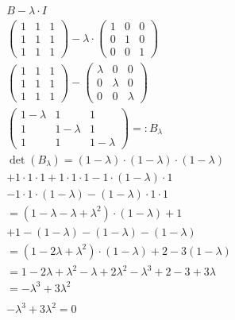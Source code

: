 \begin{align*}
    B - \lambda \cdot I \\
    \begin{pmatrix}
        1 & 1 & 1 \\
        1 & 1 & 1 \\
        1 & 1 & 1
    \end{pmatrix} - \lambda \cdot \begin{pmatrix}
        1 & 0 & 0 \\
        0 & 1 & 0 \\
        0 & 0 & 1
    \end{pmatrix} \\
        \begin{pmatrix}
        1 & 1 & 1 \\
        1 & 1 & 1 \\
        1 & 1 & 1
    \end{pmatrix} - \begin{pmatrix}
        \lambda & 0 & 0 \\
        0 & \lambda & 0 \\
        0 & 0 & \lambda
    \end{pmatrix} \\
    \begin{pmatrix}
        1 - \lambda & 1 & 1 \\
        1 & 1 - \lambda & 1 \\
        1 & 1 & 1 - \lambda
    \end{pmatrix} =: B_\lambda \\
    \det(B_\lambda) = (1 - \lambda) \cdot (1 - \lambda) \cdot (1 - \lambda) \\
                    + 1 \cdot 1 \cdot 1 + 1 \cdot 1 \cdot 1 - 1 \cdot (1 - \lambda) \cdot 1 \\
                    - 1 \cdot 1 \cdot (1 - \lambda) - (1 - \lambda) \cdot 1 \cdot 1 \\
    = (1 -\lambda - \lambda + \lambda^2) \cdot (1 - \lambda) + 1 \\
        + 1 - (1 - \lambda) - (1 - \lambda) - (1 - \lambda) \\
    = (1 - 2\lambda + \lambda^2) \cdot (1 - \lambda) + 2 - 3(1 - \lambda) \\
    = 1 - 2\lambda + \lambda^2 - \lambda + 2\lambda^2 - \lambda^3 + 2 - 3 + 3\lambda \\
    = -\lambda^3 + 3\lambda^2 \\\\
    -\lambda^3 + 3\lambda^2 = 0 \\

\end{align*}
